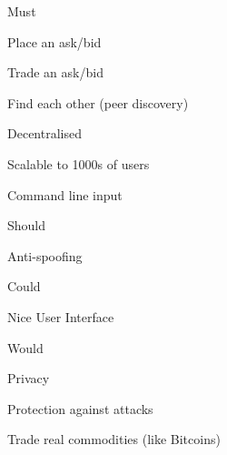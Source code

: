 \begin{myitemize}
\item Must
\begin{myitemize}
	\item Place an ask/bid
	\item Trade an ask/bid
    \item Find each other (peer discovery)
    \item Decentralised
    \item Scalable to 1000s of users
    \item Command line input
\end{myitemize}
\item Should
\begin{myitemize}
	\item Anti-spoofing
\end{myitemize}
\item Could
\begin{myitemize}
	\item Nice User Interface
\end{myitemize}
\item Would
\begin{myitemize}
	\item Privacy
	\item Protection against attacks
	\item Trade real commodities (like Bitcoins)
\end{myitemize}
\end{myitemize}

